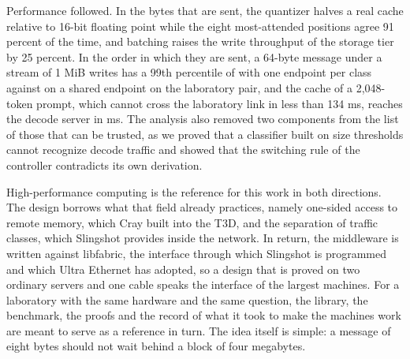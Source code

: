 Performance followed. In the bytes that are sent, the quantizer halves a
real cache relative to 16-bit floating point while the eight most-attended
positions agree 91 percent of the time, and batching raises the write
throughput of the storage tier by 25 percent. In the order in which they
are sent, a 64-byte message under a stream of 1 MiB writes has a 99th
percentile of \blank\us{} with one endpoint per class against \blank\us{} on
a shared endpoint on the laboratory pair, and the cache of a 2,048-token
prompt, which cannot cross the laboratory link in less than 134 ms, reaches
the decode server in \blank{} ms.  The analysis also removed
two components from the list of those that can be trusted, as we proved that
a classifier built on size thresholds cannot recognize decode traffic and
showed that the switching rule of the controller contradicts its own
derivation.

High-performance computing is the reference for this work in both
directions. The design borrows what that field already practices, namely
one-sided access to remote memory, which Cray built into the T3D, and the
separation of traffic classes, which Slingshot provides inside the network.
In return, the middleware is written against libfabric, the interface
through which Slingshot is programmed and which Ultra Ethernet has adopted,
so a design that is proved on two ordinary servers and one cable speaks the
interface of the largest machines. For a laboratory with the same hardware
and the same question, the library, the benchmark, the proofs and the record
of what it took to make the machines work are meant to serve as a reference
in turn. The idea itself is simple: a message of eight bytes should not
wait behind a block of four megabytes. 
